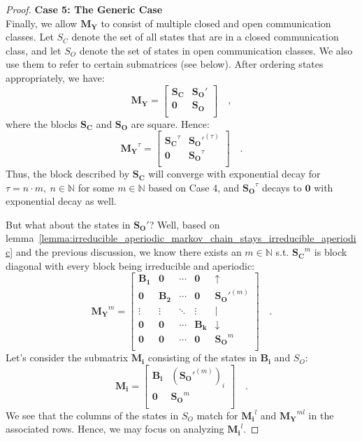 \documentclass[../../main.tex]{subfiles}
\begin{document}
\begin{proof}
        \textbf{Case 5: The Generic Case} \\
        Finally, we allow $\bm{M_Y}$ to consist of multiple closed and open communication classes. Let $S_C$ denote the set of all states that are in a closed communication class, and let $S_O$ denote the set of states in open communication classes. We also use them to refer to certain submatrices (see below). After ordering states appropriately, we have:
        \[
            \bm{M_Y} = 
            \begin{bmatrix}
            \bm{S_C} & \bm{S_O}' \\
            \bm{0} & \bm{S_O} \\
            \end{bmatrix}
            \quad ,
        \]
        where the blocks $\bm{S_C}$ and $\bm{S_O}$ are square. Hence:
        \[
            \bm{M_Y}^\tau = 
            \begin{bmatrix}
            \bm{S_C}^\tau & \bm{S_O}'^{(\tau)} \\
            \bm{0} & \bm{S_O}^{\tau} \\
            \end{bmatrix}
            \quad .
        \]
        Thus, the block described by $\bm{S_C}$ will converge with exponential decay for $\tau = n \cdot m, \ n \in \mathbb{N}$ for some $m \in \mathbb{N}$ based on Case 4, and $\bm{S_O}^{\tau}$ decays to $\bm{0}$ with exponential decay as well.

        But what about the states in $\bm{S_O}'$? Well, based on lemma~\ref{lemma:irreducible_aperiodic_markov_chain_stays_irreducible_aperiodic} and the previous discussion, we know there exists an $m \in \mathbb{N}$ s.t. $\bm{S_C}^m$ is block diagonal with every block being irreducible and aperiodic:
        \[
            \bm{M_Y}^m = 
            \begin{bmatrix}
            \bm{B_1} & \bm{0} & \cdots & \bm{0} & \uparrow \\
            \bm{0} & \bm{B_2} & \cdots & \bm{0} & \bm{S_O}'^{(m)} \\
            \vdots & \vdots & \ddots & \vdots & \mid \\
            \bm{0} & \bm{0} & \cdots & \bm{B_k} & \downarrow \\
            \bm{0} & \bm{0} & \cdots & \bm{0} & \bm{S_O}^{m} \\
            \end{bmatrix}
            \quad .
        \]
        Let's consider the submatrix $\bm{M_i}$ consisting of the states in $\bm{B_i}$ and $S_O$:
        \[
            \bm{M_i} = 
            \begin{bmatrix}
            \bm{B_i} & (\bm{S_O}'^{(m)})_i \\
            \bm{0} & \bm{S_O}^{m} \\
            \end{bmatrix}
            \quad .
        \]
        We see that the columns of the states in $S_O$ match for $\bm{M_i}^l$ and $\bm{M_Y}^{ml}$ in the associated rows. Hence, we may focus on analyzing $\bm{M_i}^l$.


\end{proof}
\end{document}

